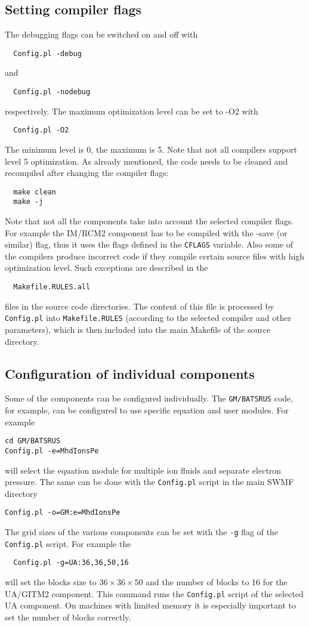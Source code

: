 \subsection{Setting compiler flags}

The debugging flags can be switched on and off with
\begin{verbatim}
  Config.pl -debug
\end{verbatim}
and
\begin{verbatim}
  Config.pl -nodebug
\end{verbatim}
respectively. The maximum optimization level can be set to -O2 with
\begin{verbatim}
  Config.pl -O2
\end{verbatim}
The minimum level is 0, the maximum is 5. Note that not all compilers support
level 5 optimization. As already mentioned, the code needs to be cleaned 
and recompiled after changing the compiler flags:
\begin{verbatim}
  make clean
  make -j
\end{verbatim}
Note that not all the components take into account the selected
compiler flags. For example the IM/RCM2 component has to be compiled 
with the -save (or similar) flag, thus it uses the flags defined in the 
{\tt CFLAGS} variable. Also some of the compilers produce incorrect
code if they compile certain source files with high optimization level.
Such exceptions are described in the 
\begin{verbatim}
  Makefile.RULES.all
\end{verbatim}
files in the source code directories. The content of this file
is processed by {\tt Config.pl} into {\tt Makefile.RULES}
(according to the selected compiler and other parameters),  
which is then included into the main Makefile of the source
directory.

\subsection{Configuration of individual components}

Some of the components can be configured individually. 
The {\tt GM/BATSRUS} code, for example, can be configured to
use specific equation and user modules.
For example
\begin{verbatim}
cd GM/BATSRUS
Config.pl -e=MhdIonsPe
\end{verbatim}
will select the equation module for multiple ion fluids and separate
electron pressure. The same can be done with the {\tt Config.pl} script
in the main SWMF directory
\begin{verbatim}
Config.pl -o=GM:e=MhdIonsPe
\end{verbatim}
The grid sizes of the various components can be set with the 
{\tt -g} flag of the {\tt Config.pl} script.
For example the
\begin{verbatim}
  Config.pl -g=UA:36,36,50,16
\end{verbatim}
will set the blocks size to $36\times 36\times 50$ and the number of blocks to 
16 for the UA/GITM2 component. This command runs the {\tt Config.pl}
script of the selected UA component. 
On machines with limited memory it is especially important to
set the number of blocks correctly. 

